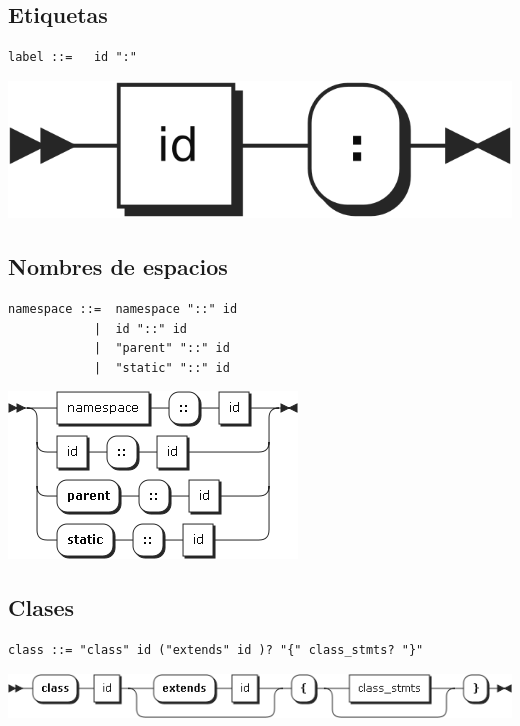 \subsection{Etiquetas}
\begin{multicols}{2}
\begin{lstlisting}[style=nonumbers]
label ::=   id ":"
\end{lstlisting}  	
\columnbreak
\begin{center}
\includegraphics[scale=0.7]{diagram/label.png} \\
\end{center}
\end{multicols}
\pagebreak
\subsection{Nombres de espacios}
\begin{multicols}{2}
\begin{lstlisting}[style=nonumbers, basicstyle=\tiny]      
namespace ::=  namespace "::" id
            |  id "::" id
            |  "parent" "::" id
            |  "static" "::" id
\end{lstlisting}  
\columnbreak	
\begin{center}
\includegraphics[scale=0.4]{diagram/namespace.png} \\
\end{center}
\end{multicols}
\subsection{Clases}
\begin{lstlisting}[style=nonumbers]
class ::= "class" id ("extends" id )? "{" class_stmts? "}"
\end{lstlisting}  	
\begin{center}
\includegraphics[scale=0.6]{diagram/class.png} \\
\end{center}
